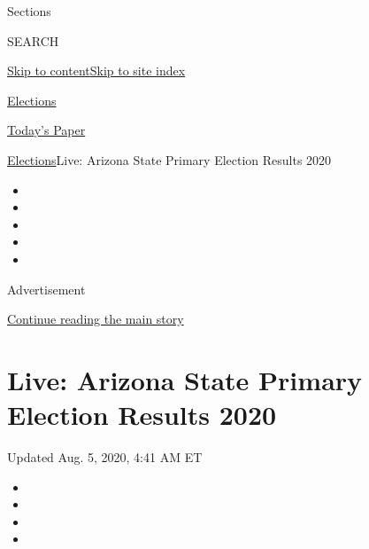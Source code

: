 Sections

SEARCH

\protect\hyperlink{site-content}{Skip to
content}\protect\hyperlink{site-index}{Skip to site index}

\href{https://www.nytimes3xbfgragh.onion/news-event/2020-election}{Elections}

\href{https://myaccount.nytimes3xbfgragh.onion/auth/login?response_type=cookie\&client_id=vi}{}

\href{https://www.nytimes3xbfgragh.onion/section/todayspaper}{Today's
Paper}

\href{/news-event/2020-election}{Elections}\textbar{}Live: Arizona State
Primary Election Results 2020

\begin{itemize}
\item
\item
\item
\item
\item
\end{itemize}

Advertisement

\protect\hyperlink{after-top}{Continue reading the main story}

\hypertarget{live-arizona-state-primary-election-results-2020}{%
\section{Live: Arizona State Primary Election Results
2020}\label{live-arizona-state-primary-election-results-2020}}

Updated Aug. 5, 2020, 4:41 AM ET

\begin{itemize}
\item
\item
\item
\item
\end{itemize}

